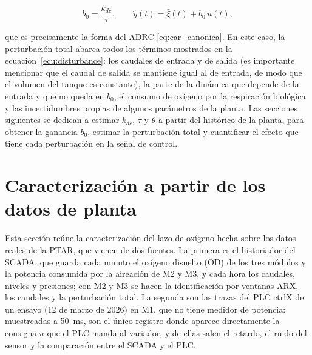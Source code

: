 \begin{equation}
b_0=\frac{k_{dc}}{\tau},
\qquad
\dot{y}(t)=\bar{\xi}(t) + b_0\, u(t),
\label{eq:car_b0}
\end{equation}

que es precisamente la forma del ADRC \eqref{eq:car_canonica}. En este caso,
la perturbación total abarca todos los términos mostrados en la
ecuación~\eqref{ecu:disturbance}: los caudales de entrada y de salida (es
importante mencionar que el caudal de salida se mantiene igual al de entrada,
de modo que el volumen del tanque es constante), la parte de la dinámica que
depende de la entrada y que no queda en $b_0$, el consumo de oxígeno por la
respiración biológica y las incertidumbres propias de algunos parámetros de la
planta. Las secciones siguientes se dedican a estimar $k_{dc}$, $\tau$ y
$\theta$ a partir del histórico de la planta, para obtener la ganancia $b_0$,
estimar la perturbación total y cuantificar el efecto que tiene cada
perturbación en la señal de control.

\section{Caracterización a partir de los datos de planta}
\label{sec:ident}

Esta sección reúne la caracterización del lazo de oxígeno hecha sobre los datos reales de la PTAR, que
vienen de dos fuentes. La primera es el historiador del SCADA, que guarda cada minuto el oxígeno disuelto
(OD) de los tres módulos y la potencia consumida por la aireación de M2 y M3, y cada hora los caudales,
niveles y presiones; con M2 y M3 se hacen la identificación por ventanas ARX, los caudales y la
perturbación total. La segunda son las trazas del PLC ctrlX de un ensayo (12 de marzo de 2026) en M1, que
no tiene medidor de potencia: muestreadas a 50~ms, son el único registro donde aparece directamente la
consigna $u$ que el PLC manda al variador, y de ellas salen el retardo, el ruido del sensor y la
comparación entre el SCADA y el PLC.

